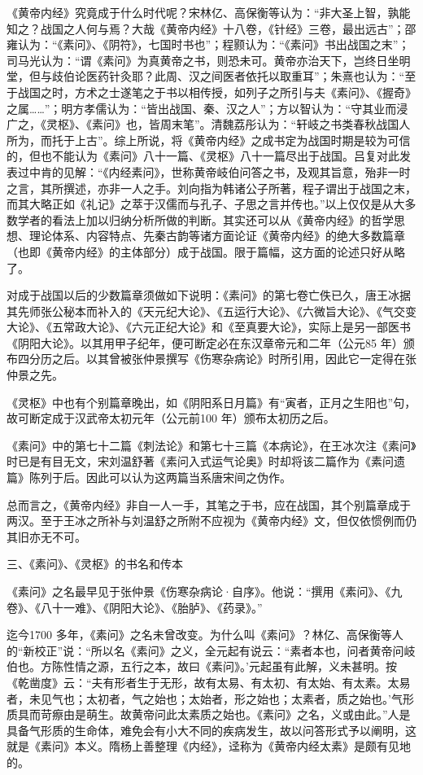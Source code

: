 \documentclass[a4paper,12pt,UTF8,twoside]{ctexbook}
\begin{document}
	《黄帝内经》究竟成于什么时代呢？宋林亿、高保衡等认为：“非大圣上智，孰能知之？战国之人何与焉？大哉《黄帝内经》十八卷，《针经》三卷，最出远古”；邵雍认为：“《素问》、《阴符》，七国时书也”；程颢认为：“《素问》书出战国之末”；司马光认为：“谓《素问》为真黄帝之书，则恐未可。黄帝亦治天下，岂终日坐明堂，但与歧伯论医药针灸耶？此周、汉之间医者依托以取重耳”；朱熹也认为：“至于战国之时，方术之士遂笔之于书以相传授，如列子之所引与夫《素问》、《握奇》之属……”；明方孝儒认为：“皆出战国、秦、汉之人”；方以智认为：“守其业而浸广之，《灵枢》、《素问》也，皆周末笔”。清魏荔彤认为：“轩岐之书类春秋战国人所为，而托于上古”。综上所说，将《黄帝内经》之成书定为战国时期是较为可信的，但也不能认为《素问》八十一篇、《灵枢》八十一篇尽出于战国。吕复对此发表过中肯的见解：“《内经素问》，世称黄帝岐伯问答之书，及观其旨意，殆非一时之言，其所撰述，亦非一人之手。刘向指为韩诸公子所著，程子谓出于战国之末，而其大略正如《礼记》之萃于汉儒而与孔子、子思之言并传也。”以上仅仅是从大多数学者的看法上加以归纳分析所做的判断。其实还可以从《黄帝内经》的哲学思想、理论体系、内容特点、先秦古韵等诸方面论证《黄帝内经》的绝大多数篇章（也即《黄帝内经》的主体部分）成于战国。限于篇幅，这方面的论述只好从略了。
	
	对成于战国以后的少数篇章须做如下说明：《素问》的第七卷亡佚已久，唐王冰据其先师张公秘本而补入的《天元纪大论》、《五运行大论》、《六微旨大论》、《气交变大论》、《五常政大论》、《六元正纪大论》和《至真要大论》，实际上是另一部医书《阴阳大论》。以其用甲子纪年，便可断定必在东汉章帝元和二年（公元85 年）颁布四分历之后。以其曾被张仲景撰写《伤寒杂病论》时所引用，因此它一定得在张仲景之先。
	
	《灵枢》中也有个别篇章晚出，如《阴阳系日月篇》有“寅者，正月之生阳也”句，故可断定成于汉武帝太初元年（公元前100 年）颁布太初历之后。
	
	《素问》中的第七十二篇《刺法论》和第七十三篇《本病论》，在王冰次注《素问》时已是有目无文，宋刘温舒著《素问入式运气论奥》时却将该二篇作为《素问遗篇》陈列于后。因此可以认为这两篇当系唐宋间之伪作。
	
	总而言之，《黄帝内经》非自一人一手，其笔之于书，应在战国，其个别篇章成于两汉。至于王冰之所补与刘温舒之所附不应视为《黄帝内经》文，但仅依惯例而仍其旧亦无不可。
	
	三、《素问》、《灵枢》的书名和传本
	
	《素问》之名最早见于张仲景《伤寒杂病论·自序》。他说：“撰用《素问》、《九卷》、《八十一难》、《阴阳大论》、《胎胪》、《药录》。”
	
	迄今1700 多年，《素问》之名未曾改变。为什么叫《素问》？林亿、高保衡等人的“新校正”说：“所以名《素问》之义，全元起有说云：“素者本也，问者黄帝问岐伯也。方陈性情之源，五行之本，故曰《素问》。’元起虽有此解，义未甚明。按《乾凿度》云：“夫有形者生于无形，故有太易、有太初、有太始、有太素。太易者，未见气也；太初者，气之始也；太始者，形之始也；太素者，质之始也。’气形质具而苛瘵由是萌生。故黄帝问此太素质之始也。《素问》之名，义或由此。”人是具备气形质的生命体，难免会有小大不同的疾病发生，故以问答形式予以阐明，这就是《素问》本义。隋杨上善整理《内经》，迳称为《黄帝内经太素》是颇有见地的。
	
\end{document}
